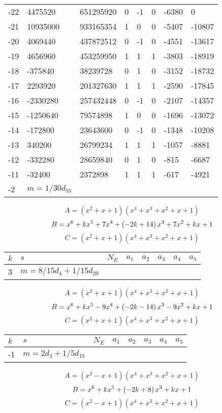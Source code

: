 \documentclass{amsart}
\begin{document}
\begin{longtable}{|l|l|l|lllll|}
-22&4475520&651295920&0&-1&0&-6380&0\\
-21&10935000&933165354&1&0&0&-5407&-10807\\
-20&4069440&437872512&0&-1&0&-4551&-13617\\
-19&4656960&453259950&1&1&1&-3803&-18919\\
-18&-375840&38239728&0&1&0&-3152&-18732\\
-17&2293920&201327630&1&1&1&-2590&-17845\\
-16&-2330280&257432448&0&-1&0&-2107&-14357\\
-15&-1250640&79574898&1&0&0&-1696&-13072\\
-14&-172800&23643600&0&-1&0&-1348&-10208\\
-13&340200&26799234&1&1&1&-1057&-8881\\
-12&-332280&28659840&0&1&0&-815&-6687\\
-11&-32400&2372898&1&1&1&-617&-4921\\
-2&$m=1/30d_{55}$&&\multicolumn{5}{c|}{}\\
\hline
\end{longtable}
$$A=(x^2
 + x
 + 1)(x^4
 + x^3
 + x^2
 + x
 + 1)$$
$$B=x^6
 + k\*x^5
 + 7\*x^4
 + \left(-2\*k
 + 14\right) \*x^3
 + 7\*x^2
 + k\*x
 + 1$$
$$C=(x^2
 + x
 + 1)(x^4
 + x^3
 + x^2
 + x
 + 1)$$
\begin{longtable}{|l|l|l|lllll|}
\hline
$k$ & $s$ & $N_E$ & $a_1$ & $a_2$ & $a_3$ & $a_4$ & $a_5$\\
\hline
3&$m=8/15d_{4}+1/15d_{20}$&&\multicolumn{5}{c|}{}\\
\hline
\end{longtable}
$$A=(x^2
 + x
 + 1)(x^4
 + x^3
 + x^2
 + x
 + 1)$$
$$B=x^6
 + k\*x^5
 - 9\*x^4
 + \left(-2\*k
 - 14\right) \*x^3
 - 9\*x^2
 + k\*x
 + 1$$
$$C=(x^2
 + x
 + 1)(x^4
 + x^3
 + x^2
 + x
 + 1)$$
\begin{longtable}{|l|l|l|lllll|}
\hline
$k$ & $s$ & $N_E$ & $a_1$ & $a_2$ & $a_3$ & $a_4$ & $a_5$\\
\hline
-1&$m=2d_{3}+1/5d_{15}$&&\multicolumn{5}{c|}{}\\
\hline
\end{longtable}
$$A=(x^2
 - x
 + 1)(x^4
 + x^3
 + x^2
 + x
 + 1)$$
$$B=x^6
 + k\*x^5
 + \left(-2\*k
 + 8\right) \*x^3
 + k\*x
 + 1$$
$$C=(x^2
 - x
 + 1)(x^4
 + x^3
 + x^2
 + x
 + 1)$$
\end{document}
